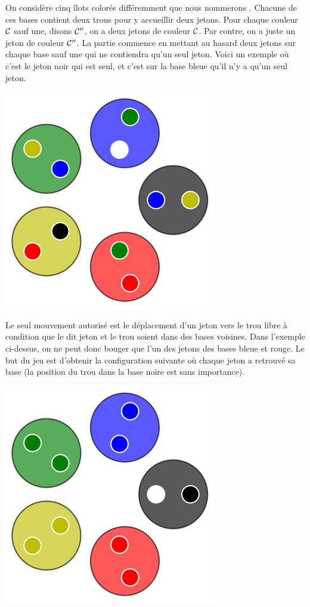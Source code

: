 On considère cinq îlots colorés différemment que nous nommerons . Chacune de ces bases contient deux trous pour y accueillir deux jetons.
Pour chaque couleur $\cal C$ sauf une, disons $\cal C^{\prime\prime}$, on a deux jetons de couleur $\cal C$.
Par contre, on a juste un jeton de couleur $\cal C^{\prime\prime}$.
La partie commence en mettant au hasard deux jetons sur chaque base sauf une qui ne contiendra qu'un seul jeton. 
Voici un exemple où c'est le jeton noir qui est seul, et c'est sur la base bleue qu'il n'y a qu'un seul jeton.

\begin{center}   %
	\includegraphics[scale= 0.3]{content/rules/start.png}
\end{center}

Le seul mouvement autorisé est le déplacement d'un jeton vers le trou libre à condition que le dit jeton et le trou soient dans des bases  voisines. Dans l'exemple ci-dessus, on ne peut donc bouger que l'un des jetons des bases bleue et rouge. Le but du jeu est d'obtenir la configuration suivante où chaque jeton a retrouvé sa base (la position du trou dans la base noire est sans importance).

\begin{center}
	\includegraphics[scale= 0.3]{content/rules/end.png}
\end{center}

